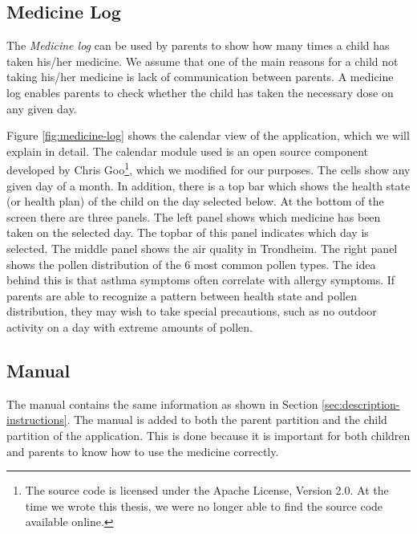 \subsection{Medicine Log}
\label{sec:description-medicine-log}
The \emph{Medicine log} can be used by parents to show how many times a child has taken his/her medicine. We assume that one of the main reasons for a child not taking his/her medicine is lack of communication between parents. A medicine log enables parents to check whether the child has taken the necessary dose on any given day.


Figure \ref{fig:medicine-log} shows the calendar view of the application, which we will explain in detail. The calendar module used is an open source component developed by Chris Goo\footnote{The source code is licensed under the Apache License, Version 2.0. At the time we wrote this thesis, we were no longer able to find the source code available online.}, which we modified for our purposes. The cells show any given day of a month. In addition, there is a top bar which shows the health state (or health plan) of the child on the day selected below. At the bottom of the screen there are three panels. The left panel shows which medicine has been taken on the selected day. The topbar of this panel indicates which day is selected. The middle panel shows the air quality in Trondheim. The right panel shows the pollen distribution of the 6 most common pollen types. The idea behind this is that asthma symptoms often correlate with allergy symptoms. If parents are able to recognize a pattern between health state and pollen distribution, they may wish to take special precautions, such as no outdoor activity on a day with extreme amounts of pollen.    


\subsection{Manual}
\label{sec:description-manual}
The manual contains the same information as shown in Section \ref{sec:description-instructions}. The manual is added to both the parent partition and the child partition of the application. This is done because it is important for both children and parents to know how to use the medicine correctly. 


